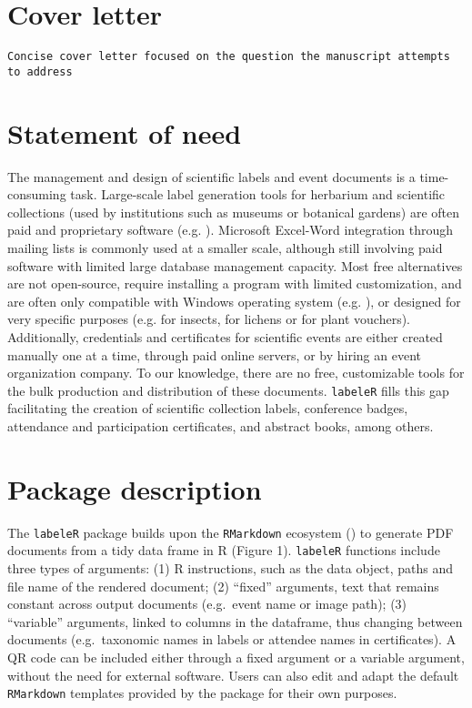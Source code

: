 \documentclass[draft,linenumbers]{agujournal2018}
\begin{document}
\vskip18pt
\section{Cover letter}

\begin{verbatim}
Concise cover letter focused on the question the manuscript attempts to address
\end{verbatim}

\section{Statement of need}

The management and design of scientific labels and event documents is a
time-consuming task. Large-scale label generation tools for herbarium
and scientific collections (used by institutions such as museums or
botanical gardens) are often paid and proprietary software (e.g.
\citet{brahms2025} \citet{irisbg2024}). Microsoft Excel-Word integration
through mailing lists is commonly used at a smaller scale, although
still involving paid software with limited large database management
capacity. Most free alternatives are not open-source, require installing
a program with limited customization, and are often only compatible with
Windows operating system (e.g. \citet{elysia2019} \citet{plabel2020}),
or designed for very specific purposes (e.g. \citet{entomolabels2022}
for insects, \citet{lichenlabler2025} for lichens or \citet{herblabel}
for plant vouchers). Additionally, credentials and certificates for
scientific events are either created manually one at a time, through
paid online servers, or by hiring an event organization company. To our
knowledge, there are no free, customizable tools for the bulk production
and distribution of these documents. \texttt{labeleR} fills this gap
facilitating the creation of scientific collection labels, conference
badges, attendance and participation certificates, and abstract books,
among others.

\section{Package description}

The \texttt{labeleR} package builds upon the \texttt{RMarkdown}
ecosystem (\citet{rmarkdown}) to generate PDF documents from a tidy data
frame in R (Figure 1). \texttt{labeleR} functions include three types of
arguments: (1) R instructions, such as the data object, paths and file
name of the rendered document; (2) ``fixed'' arguments, text that
remains constant across output documents (e.g.~event name or image
path); (3) ``variable'' arguments, linked to columns in the dataframe,
thus changing between documents (e.g.~taxonomic names in labels or
attendee names in certificates). A QR code can be included either
through a fixed argument or a variable argument, without the need for
external software. Users can also edit and adapt the default
\texttt{RMarkdown} templates provided by the package for their own
purposes.
\end{document}
